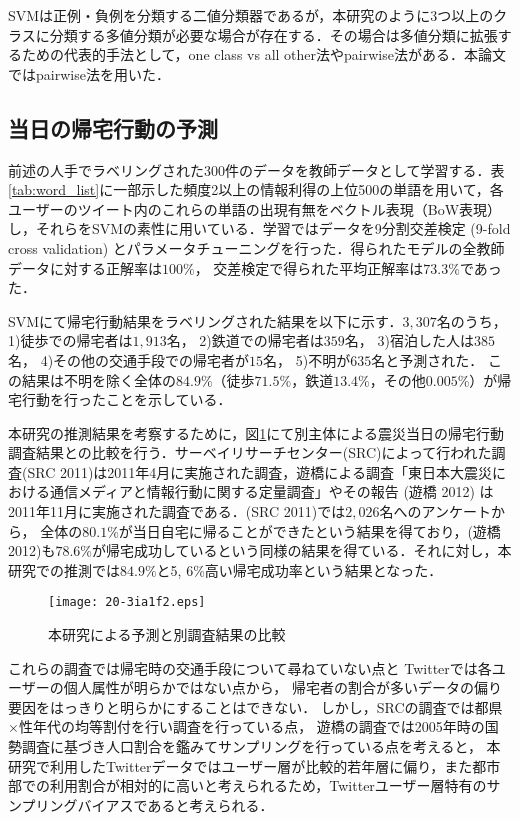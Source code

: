 \documentclass[japanese]{jnlp_1.4}
\begin{document}
SVMは正例・負例を分類する二値分類器であるが，本研究のように3つ以上のクラスに分類する多値分類が必要な場合が存在する．その場合は多値分類に拡張するための代表的手法として，one class vs all other法やpairwise法がある．本論文ではpairwise法を用いた．


\subsection{当日の帰宅行動の予測}

前述の人手でラベリングされた$300$件のデータを教師データとして学習する．表\ref{tab:word_list}に一部示した頻度2以上の情報利得の上位500の単語を用いて，各ユーザーのツイート内のこれらの単語の出現有無をベクトル表現（BoW表現）し，それらをSVMの素性に用いている．学習ではデータを9分割交差検定 (9-fold cross validation) とパラメータチューニングを行った．得られたモデルの全教師データに対する正解率は$100\%$，
交差検定で得られた平均正解率は$73.3\%$であった．

SVMにて帰宅行動結果をラベリングされた結果を以下に示す．$3,307$名のうち，
1)徒歩での帰宅者は$1,913$名，
2)鉄道での帰宅者は$359$名，
3)宿泊した人は$385$名，
4)その他の交通手段での帰宅者が$15$名，
5)不明が$635$名と予測された．
この結果は不明を除く全体の$84.9\%$（徒歩$71.5\%$，鉄道$13.4\%$，その他$0.005\%$）が帰宅行動を行ったことを示している．

本研究の推測結果を考察するために，図\ref{fig:svm_result}にて別主体による震災当日の帰宅行動調査結果との比較を行う．サーベイリサーチセンター(SRC)によって行われた調査(SRC 2011)は2011年4月に実施された調査，遊橋による調査「東日本大震災における通信メディアと情報行動に関する定量調査」やその報告 (遊橋 2012) は2011年11月に実施された調査である．(SRC 2011)では$2,026$名へのアンケートから，
全体の$80.1\%$が当日自宅に帰ることができたという結果を得ており，(遊橋 2012)も$78.6\%$が帰宅成功しているという同様の結果を得ている．それに対し，本研究での推測では$84.9\%$と5, 6\%高い帰宅成功率という結果となった．

\begin{figure}[t]
\begin{center}
\texttt{[image: 20-3ia1f2.eps]}
\end{center}
\caption{本研究による予測と別調査結果の比較}
\label{fig:svm_result}
\vspace{-0.5\Cvs}
\end{figure}

これらの調査では帰宅時の交通手段について尋ねていない点と
Twitterでは各ユーザーの個人属性が明らかではない点から，
帰宅者の割合が多いデータの偏り要因をはっきりと明らかにすることはできない．
しかし，SRCの調査では都県$\times$性年代の均等割付を行い調査を行っている点，
遊橋の調査では2005年時の国勢調査に基づき人口割合を鑑みてサンプリングを行っている点を考えると，
本研究で利用したTwitterデータではユーザー層が比較的若年層に偏り，また都市部での利用割合が相対的に高いと考えられるため，Twitterユーザー層特有のサンプリングバイアスであると考えられる．
\end{document}
